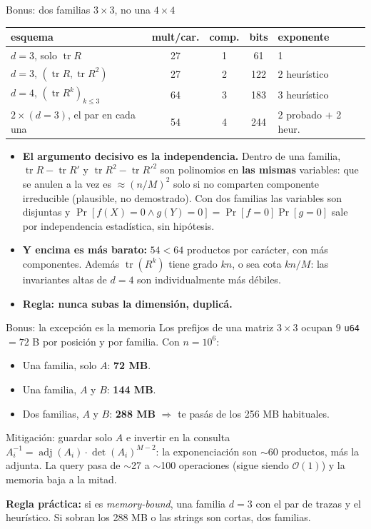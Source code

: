 \documentclass{beamer}
\begin{document}
\begin{frame}{Bonus: dos familias $3\times3$, no una $4\times4$}
\footnotesize
\begin{center}
\begin{tabular}{lcccl}
\textbf{esquema} & \textbf{mult/car.} & \textbf{comp.} & \textbf{bits} & \textbf{exponente} \\
\hline
$d=3$, solo $\operatorname{tr} R$ & 27 & 1 & 61 & 1 \\
$d=3$, $(\operatorname{tr} R, \operatorname{tr} R^2)$ & 27 & 2 & 122 & 2 heurístico \\
$d=4$, $(\operatorname{tr} R^k)_{k\le 3}$ & 64 & 3 & 183 & 3 heurístico \\
$2\times(d=3)$, el par en cada una & 54 & 4 & 244 & 2 probado $+$ 2 heur. \\
\end{tabular}
\end{center}
\begin{itemize}
    \item \textbf{El argumento decisivo es la independencia.} Dentro de una familia, $\operatorname{tr} R - \operatorname{tr} R'$ y $\operatorname{tr} R^2 - \operatorname{tr} R'^2$ son polinomios en \textbf{las mismas} variables: que se anulen a la vez es $\approx (n/M)^2$ solo si no comparten componente irreducible (plausible, no demostrado). Con dos familias las variables son disjuntas y $\Pr[f(X)=0 \wedge g(Y)=0] = \Pr[f=0]\Pr[g=0]$ sale por independencia estadística, sin hipótesis.
    \item \textbf{Y encima es más barato:} $54 < 64$ productos por carácter, con más componentes. Además $\operatorname{tr}(R^k)$ tiene grado $kn$, o sea cota $kn/M$: las invariantes altas de $d=4$ son individualmente más débiles.
    \item \textbf{Regla: nunca subas la dimensión, duplicá.}
\end{itemize}
\end{frame}

\begin{frame}{Bonus: la excepción es la memoria}
\footnotesize
Los prefijos de una matriz $3\times3$ ocupan $9$ \texttt{u64} $= 72$ B por posición y por familia. Con $n = 10^6$:
\begin{itemize}
    \item Una familia, solo $A$: \textbf{72 MB}.
    \item Una familia, $A$ y $B$: \textbf{144 MB}.
    \item Dos familias, $A$ y $B$: \textbf{288 MB} $\Rightarrow$ te pasás de los 256 MB habituales.
\end{itemize}
\begin{block}{Mitigación: guardar solo $A$ e invertir en la consulta}
$A_i^{-1} = \operatorname{adj}(A_i)\cdot\det(A_i)^{M-2}$: la exponenciación son $\sim60$ productos, más la adjunta. La query pasa de $\sim$27 a $\sim$100 operaciones (sigue siendo $\mathcal{O}(1)$) y la memoria baja a la mitad.
\end{block}
\textbf{Regla práctica:} si es \emph{memory-bound}, una familia $d=3$ con el par de trazas y el heurístico. Si sobran los 288 MB o las strings son cortas, dos familias.
\end{frame}
\end{document}
